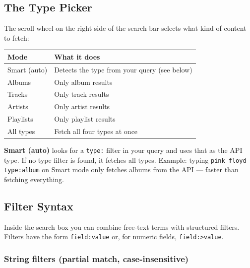 \documentclass[11pt,a4paper]{article}
\begin{document}
\subsection{The Type Picker}

The scroll wheel on the right side of the search bar selects what kind of
content to fetch:

\begin{center}
\begin{tabular}{@{}ll@{}}
\toprule
\textbf{Mode}      & \textbf{What it does} \\
\midrule
Smart (auto)   & Detects the type from your query (see below) \\
Albums         & Only album results \\
Tracks         & Only track results \\
Artists        & Only artist results \\
Playlists      & Only playlist results \\
All types      & Fetch all four types at once \\
\bottomrule
\end{tabular}
\end{center}

\textbf{Smart (auto)} looks for a \texttt{type:} filter in your query and
uses that as the API type.  If no type filter is found, it fetches all types.
Example: typing \texttt{pink floyd type:album} on Smart mode only fetches
albums from the API --- faster than fetching everything.

\subsection{Filter Syntax}

Inside the search box you can combine free-text terms with structured filters.
Filters have the form \texttt{field:value} or, for numeric fields,
\texttt{field:>value}.

\subsubsection{String filters (partial match, case-insensitive)}
\end{document}

